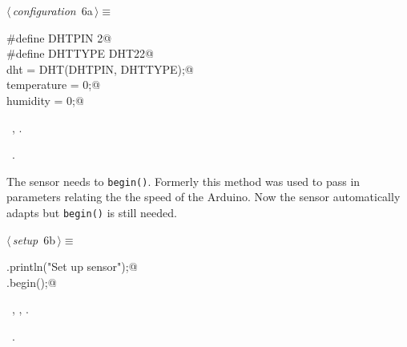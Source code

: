 \documentclass[a4paper, 11pt]{article}
\begin{document}
\begin{flushleft} \small
\begin{minipage}{\linewidth}\label{scrap3}\raggedright\small
{}$\langle\,${\itshape configuration}\nobreak\ {\footnotesize{6a}}$\,\rangle\equiv$
\vspace{-1ex}
\begin{list}{}{\setlength{\leftmargin}{1em}} \item
\mbox{}\lstinline@#define DHTPIN 2@\\
\mbox{}\lstinline@#define DHTTYPE DHT22@\\
\mbox{}\lstinline@DHT dht = DHT(DHTPIN, DHTTYPE);@\\
\mbox{}\lstinline@float temperature = 0;@\\
\mbox{}\lstinline@float humidity = 0;@\\
\mbox{}{\NWsep}
\end{list}
\vspace{-1ex}
\vspace{-1ex}
\footnotesize
\begin{list}{}{\setlength{\itemsep}{-\parsep}\setlength{\itemindent}{-\leftmargin}}
\item \NWtxtMacroDefBy\ , .
\item \NWtxtMacroRefIn\ .
\end{list}
\end{minipage}
\end{flushleft}

The sensor needs to \verb|begin()|.
Formerly this method was used to pass in parameters relating the the speed of the Arduino.
Now the sensor automatically adapts
but \verb|begin()| is still needed.

\begin{flushleft} \small
\begin{minipage}{\linewidth}\label{scrap4}\raggedright\small
{}$\langle\,${\itshape setup}\nobreak\ {\footnotesize{6b}}$\,\rangle\equiv$
\vspace{-1ex}
\begin{list}{}{\setlength{\leftmargin}{1em}} \item
\mbox{}\lstinline@Serial.println("Set up sensor");@\\
\mbox{}\lstinline@dht.begin();@\\
\mbox{}{\NWsep}
\end{list}
\vspace{-1ex}
\vspace{-1ex}
\footnotesize
\begin{list}{}{\setlength{\itemsep}{-\parsep}\setlength{\itemindent}{-\leftmargin}}
\item \NWtxtMacroDefBy\ , , .
\item \NWtxtMacroRefIn\ .
\end{list}
\end{minipage}
\end{flushleft}
\end{document}
